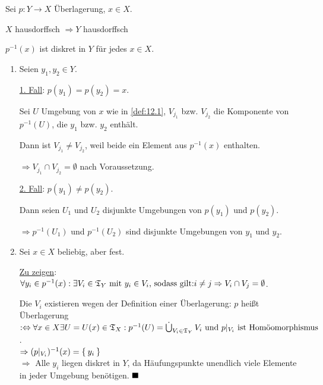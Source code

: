 \begin{bemerkung} %
    Sei $p: Y \rightarrow X$ Überlagerung, $x \in X$.
    \begin{bemenum}
        \item $X$ hausdorffsch $\Rightarrow Y$ hausdorffsch
        \item $p^{-1}(x)$ ist diskret in $Y$ für jedes $x \in X$.
    \end{bemenum}
\end{bemerkung}

\begin{beweis}\leavevmode
    \begin{enumerate}[label=\alph*)]
        \item Seien $y_1, y_2 \in Y$.

        \underline{1. Fall}: $p(y_1) = p(y_2) = x$.

        Sei $U$ Umgebung von $x$ wie in \cref{def:12.1},
        $V_{j_1}$ bzw. $V_{j_2}$ die Komponente von $p^{-1}(U)$, die
        $y_1$ bzw. $y_2$ enthält.

        Dann ist $V_{j_1} \neq V_{j_2}$, weil beide ein Element aus $p^{-1}(x)$
        enthalten.

        $\Rightarrow V_{j_1} \cap V_{j_2} = \emptyset$ nach Voraussetzung.

        \underline{2. Fall}: $p(y_1) \neq p(y_2)$.
        
        Dann seien $U_1$ und $U_2$ disjunkte Umgebungen von $p(y_1)$
        und $p(y_2)$.

        $\Rightarrow p^{-1}(U_1)$ und $p^{-1}(U_2)$ sind disjunkte 
        Umgebungen von $y_1$ und $y_2$.

        \item Sei $x \in X$ beliebig, aber fest.

        \underline{Zu zeigen}: $\forall y_i \in p^{-1}(x): \exists V_i \in \mathfrak{T}_Y \text{ mit } y_i \in V_i \text{, sodass gilt:} i \neq j \Rightarrow V_i \cap V_j = \emptyset$.

        Die $V_i$ existieren wegen der Definition einer Überlagerung:
        $p$ heißt Überlagerung $:\Leftrightarrow \forall x \in X \exists U=U(x) \in \mathfrak{T}_X: p^{-1}(U) = \mathop{\dot{\bigcup}}_{V_i \in \mathfrak{T}_Y} V_i \text{ und } p|_{V_i} \text{ ist Homöomorphismus}$.\\
        $\Rightarrow (p|_{V_i})^{-1}(x) = \Set{y_i}$\\
        $\Rightarrow$ Alle $y_i$ liegen diskret in $Y$, da Häufungspunkte unendlich
        viele Elemente in jeder Umgebung benötigen. $\qed$
    \end{enumerate}
\end{beweis}

